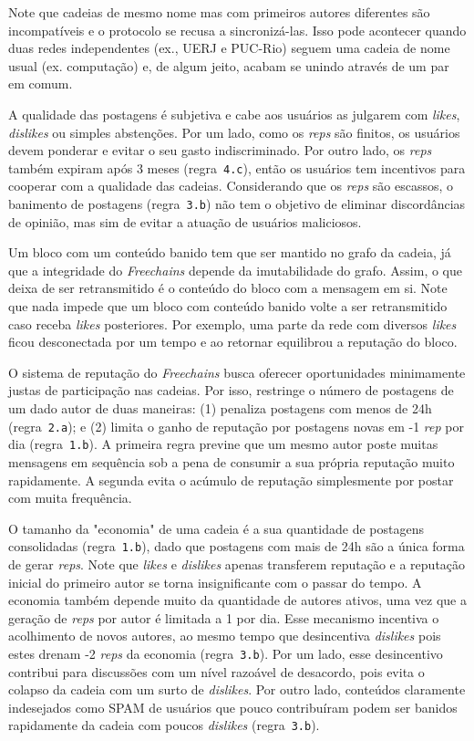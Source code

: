 \documentclass[12pt]{article}
\newcommand{\FC} {\emph{Freechains}\xspace}
\begin{document}
Note que cadeias de mesmo nome mas com primeiros autores diferentes são incompatíveis e o protocolo se recusa a sincronizá-las.
Isso pode acontecer quando duas redes independentes (ex., UERJ e PUC-Rio) seguem uma cadeia de nome usual (ex. computação) e, de algum jeito, acabam se unindo através de um par em comum.

A qualidade das postagens é subjetiva e cabe aos usuários as julgarem com \emph{likes}, \emph{dislikes} ou simples abstenções.
Por um lado, como os \emph{reps} são finitos, os usuários devem ponderar e evitar o seu gasto indiscriminado.
Por outro lado, os \emph{reps} também expiram após 3 meses (regra~\texttt{4.c}), então os usuários tem incentivos para cooperar com a qualidade das cadeias.
Considerando que os \emph{reps} são escassos, o banimento de postagens (regra~\texttt{3.b}) não tem o objetivo de eliminar discordâncias de opinião, mas sim de evitar a atuação de usuários maliciosos.

Um bloco com um conteúdo banido tem que ser mantido no grafo da cadeia, já que a integridade do \FC depende da imutabilidade do grafo.
Assim, o que deixa de ser retransmitido é o conteúdo do bloco com a mensagem em si.
Note que nada impede que um bloco com conteúdo banido volte a ser retransmitido caso receba \emph{likes} posteriores.
Por exemplo, uma parte da rede com diversos \emph{likes} ficou desconectada por um tempo e ao retornar equilibrou a reputação do bloco.

O sistema de reputação do \FC busca oferecer oportunidades minimamente justas de participação nas cadeias.
Por isso, restringe o número de postagens de um dado autor de duas maneiras:
    (1) penaliza postagens com menos de 24h (regra~\texttt{2.a}); e
    (2) limita o ganho de reputação por postagens novas em -1 \emph{rep} por dia (regra~\texttt{1.b}).
A primeira regra previne que um mesmo autor poste muitas mensagens em sequência sob a pena de consumir a sua própria reputação muito rapidamente.
A segunda evita o acúmulo de reputação simplesmente por postar com muita frequência.

O tamanho da "economia" de uma cadeia é a sua quantidade de postagens consolidadas (regra~\texttt{1.b}), dado que postagens com mais de 24h são a única forma de gerar \emph{reps}.
Note que \emph{likes} e \emph{dislikes} apenas transferem reputação e a reputação inicial do primeiro autor se torna insignificante com o passar do tempo.
A economia também depende muito da quantidade de autores ativos, uma vez que a geração de \emph{reps} por autor é limitada a 1 por dia.
Esse mecanismo incentiva o acolhimento de novos autores, ao mesmo tempo que desincentiva \emph{dislikes} pois estes drenam -2 \emph{reps} da economia (regra~\texttt{3.b}).
Por um lado, esse desincentivo contribui para discussões com um nível razoável de desacordo, pois evita o colapso da cadeia com um surto de \emph{dislikes}.
Por outro lado, conteúdos claramente indesejados como SPAM de usuários que pouco contribuíram podem ser banidos rapidamente da cadeia com poucos \emph{dislikes} (regra~\texttt{3.b}).
\end{document}
